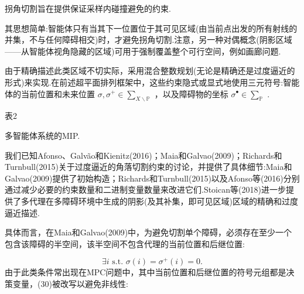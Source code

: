 \documentclass[10pt]{article}
\begin{document}
拐角切割旨在提供保证采样内碰撞避免的约束.

其思想简单:智能体只有当其下一位置位于其可见区域(由当前点出发的所有射线的并集，不与任何障碍相交)时，才避免拐角切割.注意，另一种对偶概念(阴影区域——从智能体视角隐藏的区域)可用于强制覆盖整个可行空间，例如画廊问题.

由于精确描述此类区域不切实际，采用混合整数规划(无论是精确还是过度逼近的形式)来实现.在前述超平面排列框架中，这些约束隐式或显式地使用三元符号:智能体的当前位置和未来位置 \(\sigma ,{\sigma }^{ + } \in  {\sum }_{X \smallsetminus  \mathbb{P}}\) ，以及障碍物的坐标 \({\sigma }^{ \bullet  } \in  {\sum }_{\mathbb{P}}\) .

表2

多智能体系统的MIP.

\begin{table}[h]
  \centering
  \caption{多智能体系统的MIP.}
\end{table}


我们已知Afonso、Galvão和Kienitz(2016)；Maia和Galvao(2009)；Richards和Turnbull(2015)关于过度逼近的角落切割约束的讨论，并提供了具体细节:Maia和Galvao(2009)提供了初始构造；Richards和Turnbull(2015)以及Afonso等(2016)分别通过减少必要的约束数量和二进制变量数量来改进它们.Stoican等(2018)进一步提供了多代理在多障碍环境中生成的阴影(及其补集，即可见区域)区域的精确和过度逼近描述.

具体而言，在Maia和Galvao(2009)中，为避免切割单个障碍，必须存在至少一个包含该障碍的半空间，该半空间不包含代理的当前位置和后继位置:


\begin{equation}
\exists i\text{ s.t. }\sigma \left( i\right)  = {\sigma }^{ + }\left( i\right)  = 0.
\end{equation}
由于此类条件常出现在MPC问题中，其中当前位置和后继位置的符号元组都是决策变量，(30)被改写以避免非线性:
\end{document}
